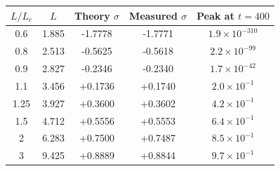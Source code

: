 \begin{tabular}{ccccc}
\toprule
$L/L_c$ & $L$ & Theory $\sigma$ & Measured $\sigma$ & Peak at $t=400$ \\
\midrule
0.6 & 1.885 & -1.7778 & -1.7771 & $1.9\times 10^{-310}$ \\
0.8 & 2.513 & -0.5625 & -0.5618 & $2.2\times 10^{-99}$ \\
0.9 & 2.827 & -0.2346 & -0.2340 & $1.7\times 10^{-42}$ \\
1.1 & 3.456 & +0.1736 & +0.1740 & $2.0\times 10^{-1}$ \\
1.25 & 3.927 & +0.3600 & +0.3602 & $4.2\times 10^{-1}$ \\
1.5 & 4.712 & +0.5556 & +0.5553 & $6.4\times 10^{-1}$ \\
2 & 6.283 & +0.7500 & +0.7487 & $8.5\times 10^{-1}$ \\
3 & 9.425 & +0.8889 & +0.8844 & $9.7\times 10^{-1}$ \\
\bottomrule
\end{tabular}
